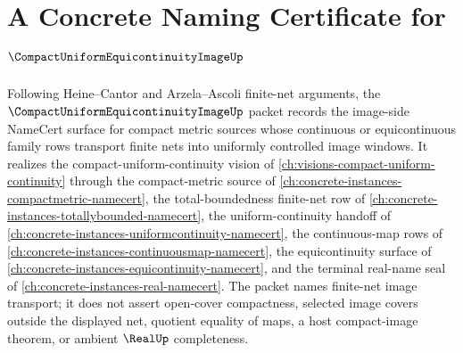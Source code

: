 \chapter{A Concrete Naming Certificate for $\CompactUniformEquicontinuityImageUp$}
\label{ch:concrete-instances-compact-uniform-equicontinuity-image-namecert}

Following Heine--Cantor and Arzela--Ascoli finite-net arguments, the $\CompactUniformEquicontinuityImageUp$ packet records the image-side NameCert surface for compact metric sources whose continuous or equicontinuous family rows transport finite nets into uniformly controlled image windows. It realizes the compact-uniform-continuity vision of \autoref{ch:visions-compact-uniform-continuity} through the compact-metric source of \autoref{ch:concrete-instances-compactmetric-namecert}, the total-boundedness finite-net row of \autoref{ch:concrete-instances-totallybounded-namecert}, the uniform-continuity handoff of \autoref{ch:concrete-instances-uniformcontinuity-namecert}, the continuous-map rows of \autoref{ch:concrete-instances-continuousmap-namecert}, the equicontinuity surface of \autoref{ch:concrete-instances-equicontinuity-namecert}, and the terminal real-name seal of \autoref{ch:concrete-instances-real-namecert}. The packet names finite-net image transport; it does not assert open-cover compactness, selected image covers outside the displayed net, quotient equality of maps, a host compact-image theorem, or ambient $\RealUp$ completeness.

